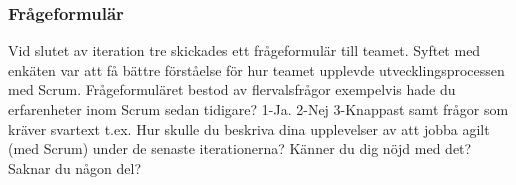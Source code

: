 \subsubsection {Frågeformulär}
Vid slutet av iteration tre skickades ett frågeformulär till teamet. Syftet med enkäten var att få bättre förståelse för hur teamet upplevde utvecklingsprocessen med Scrum. Frågeformuläret bestod av flervalsfrågor exempelvis hade du erfarenheter inom Scrum sedan tidigare? 1-Ja. 2-Nej 3-Knappast samt frågor som kräver svartext t.ex. Hur skulle du beskriva dina upplevelser av att jobba agilt (med Scrum) under de senaste iterationerna? Känner du dig nöjd med det? Saknar du någon del?
